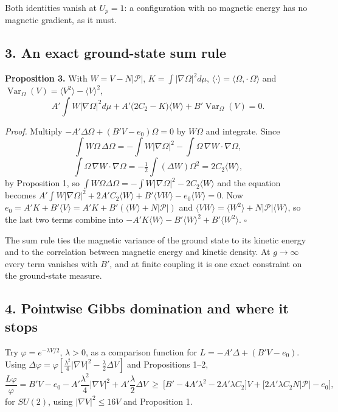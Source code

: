 \documentclass[11pt,a4paper]{article}
\begin{document}
Both identities vanish at \(U_p=1\): a configuration with no magnetic
energy has no magnetic gradient, as it must.

\hypertarget{an-exact-ground-state-sum-rule}{%
\subsection{3. An exact ground-state sum
rule}\label{an-exact-ground-state-sum-rule}}

\textbf{Proposition 3.} With \(W=V-N|\mathcal P|\),
\(K=\int|\nabla\Omega|^2d\mu\),
\(\langle\cdot\rangle=\langle\Omega,\cdot\,\Omega\rangle\) and
\(\operatorname{Var}_\Omega(V)=\langle V^2\rangle-\langle V\rangle^2\),
\[A'\!\int W\big|\nabla\Omega\big|^2d\mu
+A'\big(2C_2-K\big)\langle W\rangle
+B'\operatorname{Var}_\Omega(V)=0 .\]

\emph{Proof.} Multiply \(-A'\Delta\Omega+(B'V-e_0)\Omega=0\) by
\(W\Omega\) and integrate. Since
\[\int W\Omega\,\Delta\Omega=-\int W|\nabla\Omega|^2-\int\Omega\,\nabla W\!\cdot\!\nabla\Omega,\]
\[\int\Omega\,\nabla W\!\cdot\!\nabla\Omega=-\tfrac12\int(\Delta W)\Omega^2=2C_2\langle W\rangle,\]
by Proposition 1, so
\(\int W\Omega\Delta\Omega=-\int W|\nabla\Omega|^2-2C_2\langle W\rangle\)
and the equation becomes
\(A'\int W|\nabla\Omega|^2+2A'C_2\langle W\rangle+B'\langle VW\rangle-e_0\langle W\rangle=0\).
Now
\(e_0=A'K+B'\langle V\rangle=A'K+B'(\langle W\rangle+N|\mathcal P|)\)
and
\(\langle VW\rangle=\langle W^2\rangle+N|\mathcal P|\langle W\rangle\),
so the last two terms combine into
\(-A'K\langle W\rangle-B'\langle W\rangle^2+B'\langle W^2\rangle\).
\(\square\)

The sum rule ties the magnetic variance of the ground state to its
kinetic energy and to the correlation between magnetic energy and
kinetic density. At \(g\to\infty\) every term vanishes with \(B'\), and
at finite coupling it is one exact constraint on the ground-state
measure.

\hypertarget{pointwise-gibbs-domination-and-where-it-stops}{%
\subsection{4. Pointwise Gibbs domination and where it
stops}\label{pointwise-gibbs-domination-and-where-it-stops}}

Try \(\varphi=e^{-\lambda V/2}\), \(\lambda>0\), as a comparison
function for \(L=-A'\Delta+(B'V-e_0)\). Using
\(\Delta\varphi=\varphi[\tfrac{\lambda^2}4|\nabla V|^2-\tfrac\lambda2\Delta V]\)
and Propositions 1--2, \[\frac{L\varphi}{\varphi}
=B'V-e_0-A'\frac{\lambda^2}4|\nabla V|^2+A'\frac\lambda2\Delta V
\ \ge\ \Big[B'-4A'\lambda^2-2A'\lambda C_2\Big]V
+\Big[2A'\lambda C_2N|\mathcal P|-e_0\Big],\] for \(SU(2)\), using
\(|\nabla V|^2\le16V\) and Proposition 1.
\end{document}
